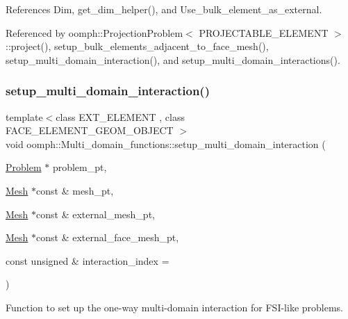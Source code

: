 References Dim, get\+\_\+dim\+\_\+helper(), and Use\+\_\+bulk\+\_\+element\+\_\+as\+\_\+external.



Referenced by oomph\+::\+Projection\+Problem$<$ P\+R\+O\+J\+E\+C\+T\+A\+B\+L\+E\+\_\+\+E\+L\+E\+M\+E\+N\+T $>$\+::project(), setup\+\_\+bulk\+\_\+elements\+\_\+adjacent\+\_\+to\+\_\+face\+\_\+mesh(), setup\+\_\+multi\+\_\+domain\+\_\+interaction(), and setup\+\_\+multi\+\_\+domain\+\_\+interactions().

\mbox{\label{namespaceoomph_1_1Multi__domain__functions_a5fb45ad7165cc546b5e34e01a53478d8}} 
\subsubsection{\texorpdfstring{setup\+\_\+multi\+\_\+domain\+\_\+interaction()}{setup\_multi\_domain\_interaction()}\hspace{0.1cm}{\footnotesize\ttfamily [2/3]}}
{\footnotesize\ttfamily template$<$class E\+X\+T\+\_\+\+E\+L\+E\+M\+E\+NT , class F\+A\+C\+E\+\_\+\+E\+L\+E\+M\+E\+N\+T\+\_\+\+G\+E\+O\+M\+\_\+\+O\+B\+J\+E\+CT $>$ \\
void oomph\+::\+Multi\+\_\+domain\+\_\+functions\+::setup\+\_\+multi\+\_\+domain\+\_\+interaction (\begin{DoxyParamCaption}\item[{\hyperlink{classoomph_1_1Problem}{Problem} $\ast$}]{problem\+\_\+pt,  }\item[{\hyperlink{classoomph_1_1Mesh}{Mesh} $\ast$const \&}]{mesh\+\_\+pt,  }\item[{\hyperlink{classoomph_1_1Mesh}{Mesh} $\ast$const \&}]{external\+\_\+mesh\+\_\+pt,  }\item[{\hyperlink{classoomph_1_1Mesh}{Mesh} $\ast$const \&}]{external\+\_\+face\+\_\+mesh\+\_\+pt,  }\item[{const unsigned \&}]{interaction\+\_\+index = {} }\end{DoxyParamCaption})}



Function to set up the one-\/way multi-\/domain interaction for F\+S\+I-\/like problems. 


